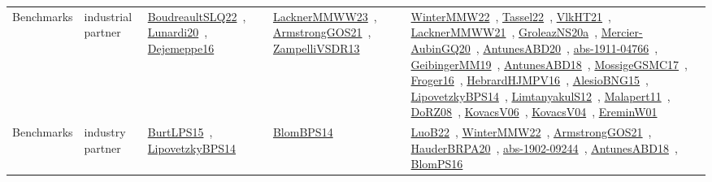 {\begin{longtable}{lp{3cm}>{\raggedright\arraybackslash}p{6cm}>{\raggedright\arraybackslash}p{6cm}>{\raggedright\arraybackslash}p{8cm}}
\index{industrial partner}\index{Benchmarks!industrial partner}Benchmarks & industrial partner & \href{../works/BoudreaultSLQ22.pdf}{BoudreaultSLQ22}~\cite{BoudreaultSLQ22}, \href{../works/Lunardi20.pdf}{Lunardi20}~\cite{Lunardi20}, \href{../works/Dejemeppe16.pdf}{Dejemeppe16}~\cite{Dejemeppe16} & \href{../works/LacknerMMWW23.pdf}{LacknerMMWW23}~\cite{LacknerMMWW23}, \href{../works/ArmstrongGOS21.pdf}{ArmstrongGOS21}~\cite{ArmstrongGOS21}, \href{../works/ZampelliVSDR13.pdf}{ZampelliVSDR13}~\cite{ZampelliVSDR13} & \href{../works/WinterMMW22.pdf}{WinterMMW22}~\cite{WinterMMW22}, \href{../works/Tassel22.pdf}{Tassel22}~\cite{Tassel22}, \href{../works/VlkHT21.pdf}{VlkHT21}~\cite{VlkHT21}, \href{../works/LacknerMMWW21.pdf}{LacknerMMWW21}~\cite{LacknerMMWW21}, \href{../works/GroleazNS20a.pdf}{GroleazNS20a}~\cite{GroleazNS20a}, \href{../works/Mercier-AubinGQ20.pdf}{Mercier-AubinGQ20}~\cite{Mercier-AubinGQ20}, \href{../works/AntunesABD20.pdf}{AntunesABD20}~\cite{AntunesABD20}, \href{../works/abs-1911-04766.pdf}{abs-1911-04766}~\cite{abs-1911-04766}, \href{../works/GeibingerMM19.pdf}{GeibingerMM19}~\cite{GeibingerMM19}, \href{../works/AntunesABD18.pdf}{AntunesABD18}~\cite{AntunesABD18}, \href{../works/MossigeGSMC17.pdf}{MossigeGSMC17}~\cite{MossigeGSMC17}, \href{../works/Froger16.pdf}{Froger16}~\cite{Froger16}, \href{../works/HebrardHJMPV16.pdf}{HebrardHJMPV16}~\cite{HebrardHJMPV16}, \href{../works/AlesioBNG15.pdf}{AlesioBNG15}~\cite{AlesioBNG15}, \href{../works/LipovetzkyBPS14.pdf}{LipovetzkyBPS14}~\cite{LipovetzkyBPS14}, \href{../works/LimtanyakulS12.pdf}{LimtanyakulS12}~\cite{LimtanyakulS12}, \href{../works/Malapert11.pdf}{Malapert11}~\cite{Malapert11}, \href{../works/DoRZ08.pdf}{DoRZ08}~\cite{DoRZ08}, \href{../works/KovacsV06.pdf}{KovacsV06}~\cite{KovacsV06}, \href{../works/KovacsV04.pdf}{KovacsV04}~\cite{KovacsV04}, \href{../works/EreminW01.pdf}{EreminW01}~\cite{EreminW01}\\
\index{industry partner}\index{Benchmarks!industry partner}Benchmarks & industry partner & \href{../works/BurtLPS15.pdf}{BurtLPS15}~\cite{BurtLPS15}, \href{../works/LipovetzkyBPS14.pdf}{LipovetzkyBPS14}~\cite{LipovetzkyBPS14} & \href{../works/BlomBPS14.pdf}{BlomBPS14}~\cite{BlomBPS14} & \href{../works/LuoB22.pdf}{LuoB22}~\cite{LuoB22}, \href{../works/WinterMMW22.pdf}{WinterMMW22}~\cite{WinterMMW22}, \href{../works/ArmstrongGOS21.pdf}{ArmstrongGOS21}~\cite{ArmstrongGOS21}, \href{../works/HauderBRPA20.pdf}{HauderBRPA20}~\cite{HauderBRPA20}, \href{../works/abs-1902-09244.pdf}{abs-1902-09244}~\cite{abs-1902-09244}, \href{../works/AntunesABD18.pdf}{AntunesABD18}~\cite{AntunesABD18}, \href{../works/BlomPS16.pdf}{BlomPS16}~\cite{BlomPS16}\\

\end{longtable}}

